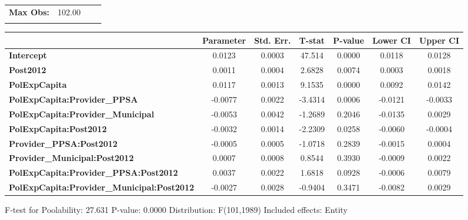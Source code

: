 \begin{center}
\begin{tabular}{lclc}
\textbf{Max Obs:}                                  &       102.00       & \textbf{                     }   &                  \\
\textbf{}                                          &                    & \textbf{                     }   &                  \\
\bottomrule
\end{tabular}
\begin{tabular}{lcccccc}
                                                   & \textbf{Parameter} & \textbf{Std. Err.} & \textbf{T-stat} & \textbf{P-value} & \textbf{Lower CI} & \textbf{Upper CI}  \\
\midrule
\textbf{Intercept}                                 &       0.0123       &       0.0003       &      47.514     &      0.0000      &       0.0118      &       0.0128       \\
\textbf{Post2012}                                  &       0.0011       &       0.0004       &      2.6828     &      0.0074      &       0.0003      &       0.0018       \\
\textbf{PolExpCapita}                              &       0.0117       &       0.0013       &      9.1535     &      0.0000      &       0.0092      &       0.0142       \\
\textbf{PolExpCapita:Provider\_PPSA}               &      -0.0077       &       0.0022       &     -3.4314     &      0.0006      &      -0.0121      &      -0.0033       \\
\textbf{PolExpCapita:Provider\_Municipal}          &      -0.0053       &       0.0042       &     -1.2689     &      0.2046      &      -0.0135      &       0.0029       \\
\textbf{PolExpCapita:Post2012}                     &      -0.0032       &       0.0014       &     -2.2309     &      0.0258      &      -0.0060      &      -0.0004       \\
\textbf{Provider\_PPSA:Post2012}                   &      -0.0005       &       0.0005       &     -1.0718     &      0.2839      &      -0.0015      &       0.0004       \\
\textbf{Provider\_Municipal:Post2012}              &       0.0007       &       0.0008       &      0.8544     &      0.3930      &      -0.0009      &       0.0022       \\
\textbf{PolExpCapita:Provider\_PPSA:Post2012}      &       0.0037       &       0.0022       &      1.6818     &      0.0928      &      -0.0006      &       0.0079       \\
\textbf{PolExpCapita:Provider\_Municipal:Post2012} &      -0.0027       &       0.0028       &     -0.9404     &      0.3471      &      -0.0082      &       0.0029       \\
\bottomrule
\end{tabular}
\end{center}

F-test for Poolability: 27.631 \newline
 P-value: 0.0000 \newline
 Distribution: F(101,1989) \newline
  \newline
 Included effects: Entity